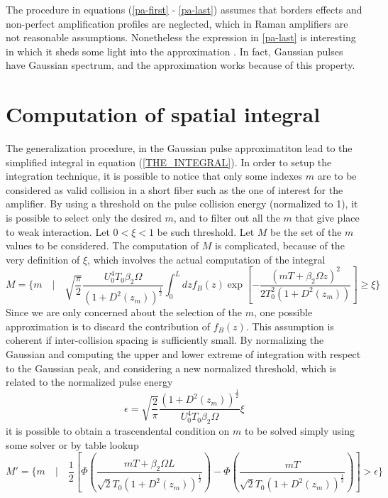 \documentclass[10pt, lettersize, journal, onecolumn]{IEEEtran}
\begin{document}
The procedure in equations (\ref{pa-first} - \ref{pa-last}) assumes that borders effects and non-perfect amplification profiles are neglected, which in Raman amplifiers are not reasonable assumptions. Nonetheless the expression in \ref{pa-last} is interesting in which it sheds some light into the approximation \cite[eq. 10]{Dar_2013}. In fact, Gaussian pulses have Gaussian spectrum, and the approximation works because of this property.

\section{Computation of spatial integral}
The generalization procedure, in the Gaussian pulse approximatiton lead to the simplified integral in equation (\ref{THE_INTEGRAL}). In order to setup the integration technique, it is possible to notice that only some indexes $m$ are to be considered as valid collision in a short fiber such as the one of interest for the amplifier. By using a threshold on the pulse collision energy (normalized to 1), it is possible to select only the desired $m$, and to filter out all the $m$ that give place to weak interaction. Let $0<\xi<1$ be such threshold. Let $M$ be the set of the $m$ values to be considered. The computation of $M$ is complicated, because of the very definition of $\xi$, which involves the actual computation of the integral
\begin{equation}
	M = \bigg\{ m \quad \bigg| \quad \sqrt{\dfrac{\pi}{2}}\dfrac{U_0^4 T_0 \beta_2 \Omega}{(1+D^2(z_m))^{\frac{1}{2}}} \int_{0}^{L} dz f_B(z) \exp\left[-\dfrac{(mT+\beta_2\Omega z)^2}{2T_0^2(1+D^2(z_m))} \right] \geq \xi \bigg\}
\end{equation}
Since we are only concerned about the selection of the $m$, one possible approximation is to discard the contribution of $f_B(z)$.
This assumption is coherent if inter-collision spacing is sufficiently small.
By normalizing the Gaussian and computing the upper and lower extreme of integration with respect to the Gaussian peak, and considering a new normalized threshold, which is related to the normalized pulse energy
\begin{equation}
	\epsilon = \sqrt{\dfrac{2}{\pi}} \dfrac{(1+D^2(z_m))^\frac{1}{2}}{U_0^4 T_0 \beta_2 \Omega} \xi
\end{equation}
it is possible to obtain a trascendental condition on $m$ to be solved simply using some solver or by table lookup
\begin{equation}
	M' = \bigg\{ m  \quad \bigg| \quad \dfrac{1}{2} \left[\Phi \left(\dfrac{mT + \beta_2 \Omega L}{\sqrt{2} T_0 (1+D^2(z_m))^\frac{1}{2} }\right) - \Phi\left(\dfrac{mT}{\sqrt{2} T_0 (1+D^2(z_m))^\frac{1}{2} } \right) \right] > \epsilon \bigg\}
\end{equation}
\end{document}
